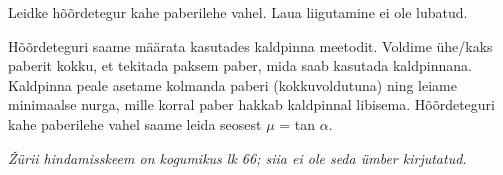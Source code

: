 
Leidke hõõrdetegur kahe paberilehe vahel. Laua liigutamine ei ole lubatud.

\hint

\solu
Hõõrdeteguri saame määrata kasutades kaldpinna meetodit. Voldime ühe/kaks paberit kokku, et tekitada paksem paber, mida saab kasutada kaldpinnana. Kaldpinna peale asetame kolmanda paberi (kokkuvoldutuna) ning leiame minimaalse nurga, mille korral paber hakkab kaldpinnal libisema. Hõõrdeteguri kahe paberilehe vahel saame leida seosest $\mu$ = tan $\alpha$.

\textit{Žürii hindamisskeem on kogumikus lk 66; siia ei ole seda ümber kirjutatud.}
\probend
